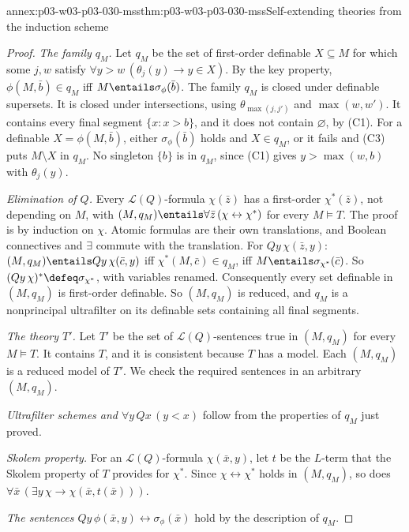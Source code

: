 \begin{annexitem}{annex:p03-w03-p03-030-mss}{thm:p03-w03-p03-030-mss}{Self-extending theories from the induction scheme}
\begin{proof}
\emph{The family \(q_M\).}  Let \(q_M\) be the set of first-order definable
\(X\subseteq M\) for which some \(j,w\) satisfy \(\forall y>w\,(\theta_j(y)
\rightarrow y\in X)\).  By the key property, \(\phi(M,\bar b)\in q_M\) iff
\(M\entails\sigma_\phi(\bar b)\).  The family \(q_M\) is closed under
definable supersets.  It is closed under intersections, using
\(\theta_{\max(j,j')}\) and \(\max(w,w')\).  It contains every final segment
\(\{x:x>b\}\), and it does not contain \(\varnothing\), by (C1).  For a
definable \(X=\phi(M,\bar b)\), either \(\sigma_\phi(\bar b)\) holds and
\(X\in q_M\), or it fails and (C3) puts \(M\setminus X\) in \(q_M\).  No
singleton \(\{b\}\) is in \(q_M\), since (C1) gives \(y>\max(w,b)\) with
\(\theta_j(y)\).

\emph{Elimination of \(Q\).}  Every \(\mathscr L(Q)\)-formula \(\chi(\bar z)\)
has a first-order \(\chi^*(\bar z)\), not depending on \(M\), with
\((M,q_M)\entails\forall\bar z\,(\chi\leftrightarrow\chi^*)\) for every
\(M\models T\).  The proof is by induction on \(\chi\).  Atomic formulas are
their own translations, and Boolean connectives and \(\exists\) commute with
the translation.  For \(Qy\,\chi(\bar z,y)\): \((M,q_M)\entails
Qy\,\chi(\bar c,y)\) iff \(\chi^*(M,\bar c)\in q_M\), iff
\(M\entails\sigma_{\chi^*}(\bar c)\).  So \((Qy\,\chi)^*\defeq\sigma_{\chi^*}\),
with variables renamed.  Consequently every set definable in \((M,q_M)\) is
first-order definable.  So \((M,q_M)\) is reduced, and \(q_M\) is a
nonprincipal ultrafilter on its definable sets containing all final
segments.

\emph{The theory \(T'\).}  Let \(T'\) be the set of \(\mathscr
L(Q)\)-sentences true in \((M,q_M)\) for every \(M\models T\).  It contains
\(T\), and it is consistent because \(T\) has a model.  Each \((M,q_M)\) is a
reduced model of \(T'\).  We check the required sentences in an arbitrary
\((M,q_M)\).

\emph{Ultrafilter schemes and \(\forall y\,Qx\,(y<x)\)} follow from the
properties of \(q_M\) just proved.

\emph{Skolem property.}  For an \(\mathscr L(Q)\)-formula \(\chi(\bar x,y)\),
let \(t\) be the \(L\)-term that the Skolem property of \(T\) provides for
\(\chi^*\).  Since \(\chi\leftrightarrow\chi^*\) holds in \((M,q_M)\), so does
\(\forall\bar x\,(\exists y\,\chi\rightarrow\chi(\bar x,t(\bar x)))\).

\emph{The sentences \(Qy\,\phi(\bar x,y)\leftrightarrow\sigma_\phi(\bar x)\)}
hold by the description of \(q_M\).


\end{proof}
\end{annexitem}
